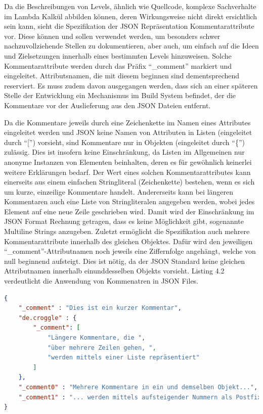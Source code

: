 Da die Beschreibungen von Levels, ähnlich wie Quellcode, komplexe Sachverhalte im Lambda Kalkül abbilden können, deren Wirkungsweise nicht direkt ersichtlich sein kann,
sieht die Spezifikation der JSON Repräsentation Kommentarattribute vor.
Diese können und sollen verwendet werden, um besonders schwer nachzuvollziehende Stellen zu dokumentieren, aber auch, um einfach auf die Ideen und Zielsetzungen innerhalb eines bestimmten Levels hinzuweisen.
Solche Kommentarattribute werden durch das Präfix "`\_comment"' markiert und eingeleitet.
Attributsnamen, die mit diesem beginnen sind dementsprechend reserviert.
Es muss zudem davon ausgegangen werden, dass sich an einer späteren Stelle der Entwicklung ein Mechanismus im Build System befindet, der die Kommentare vor der Auslieferung aus den JSON Dateien entfernt.

Da die Kommentare jeweils durch eine Zeichenkette im Namen eines Attributes eingeleitet werden und JSON keine Namen von Attributen in Listen (eingeleitet durch "`["') vorsieht, sind Kommentare nur in Objekten (eingeleitet durch "`\{"') zulässig.
Dies ist insofern keine Einschränkung, da Listen im Allgemeinen nur anonyme Instanzen von Elementen beinhalten, deren es für gewöhnlich keinerlei weitere Erklärungen bedarf.
Der Wert eines solchen Kommentarattributes kann einerseits aus einem einfachen Stringliteral (Zeichenkette) bestehen, wenn es sich um kurze, einzeilige Kommentare handelt.
Andererseits kann bei längeren Kommentaren auch eine Liste von Stringliteralen angegeben werden, wobei jedes Element auf eine neue Zeile geschrieben wird.
Damit wird der Einschränkung im JSON Format Rechnung getragen, dass es keine Möglichkeit gibt, sogenannte Multiline Strings anzugeben.
Zuletzt ermöglicht die Spezifikation auch mehrere Kommentarattribute innerhalb des gleichen Objektes.
Dafür wird den jeweiligen "`\_comment"'-Attributnamen noch jeweils eine Ziffernfolge angehängt, welche von null beginnend aufsteigt.
Dies ist nötig, da der JSON Standard keine gleichen Attributnamen innerhalb einunddesselben Objekts vorsieht.
Listing 4.2 verdeutlicht die Anwendung von Kommenatren in JSON Files.
\begin{lstlisting}[language=json,caption={Kommentare in einer JSON Datei}]
{
	"_comment" : "Dies ist ein kurzer Kommentar",
	"de.croggle" : {
		"_comment": [
			"Längere Kommentare, die ",
			"über mehrere Zeilen gehen, ",
			"werden mittels einer Liste repräsentiert"
		]
	},
	"_comment0" : "Mehrere Kommentare in ein und demselben Objekt...",
	"_comment1" : "... werden mittels aufsteigender Nummern als Postfix unterschieden"
}
\end{lstlisting}

